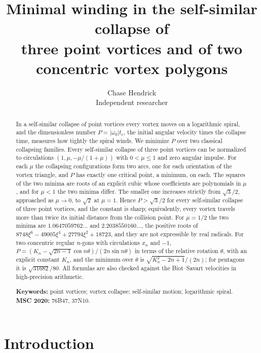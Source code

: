 \documentclass[11pt]{article}
\title{\Large\bfseries Minimal winding in the self-similar collapse of\\
  three point vortices and of two concentric vortex polygons}
\author{Chase Hendrick\\[0.2em] {\small Independent researcher}}
\date{}
\theoremstyle{definition}
\begin{document}
\maketitle

\begin{abstract}
In a self-similar collapse of point vortices every vortex moves on a logarithmic spiral, and the dimensionless number $P = |\omega_0| t_c$, the initial angular velocity times the collapse time, measures how tightly the spiral winds. We minimize $P$ over two classical collapsing families. Every self-similar collapse of three point vortices can be normalized to circulations $(1, \mu, -\mu/(1 + \mu))$ with $0 < \mu \le 1$ and zero angular impulse. For each $\mu$ the collapsing configurations form two arcs, one for each orientation of the vortex triangle, and $P$ has exactly one critical point, a minimum, on each. The squares of the two minima are roots of an explicit cubic whose coefficients are polynomials in $\mu$, and for $\mu < 1$ the two minima differ. The smaller one increases strictly from $\sqrt{3}/2$, approached as $\mu \to 0$, to $\sqrt{2}$ at $\mu = 1$. Hence $P > \sqrt{3}/2$ for every self-similar collapse of three point vortices, and the constant is sharp; equivalently, every vortex travels more than twice its initial distance from the collision point. For $\mu = 1/2$ the two minima are $1.0647059762\ldots$ and $2.2038550160\ldots$, the positive roots of $8748 \xi^6 - 49005 \xi^4 + 27794 \xi^2 + 18723$, and they are not expressible by real radicals. For two concentric regular $n$-gons with circulations $x_n$ and $-1$, $P = (K_n - \sqrt{2n - 1} \cos n\theta)/(2n \sin n\theta)$ in terms of the relative rotation $\theta$, with an explicit constant $K_n$, and the minimum over $\theta$ is $\sqrt{K_n^2 - 2n + 1}/(2n)$; for pentagons it is $\sqrt{31682}/80$. All formulas are also checked against the Biot--Savart velocities in high-precision arithmetic.

\medskip
\noindent\textbf{Keywords:} point vortices; vortex collapse; self-similar motion; logarithmic spiral.\\
\textbf{MSC 2020:} 76B47, 37N10.
\end{abstract}

\section{Introduction}
\end{document}
